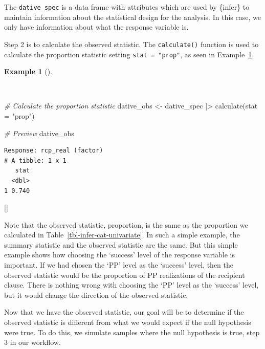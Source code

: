 \documentclass[
  letterpaper,
  krantz1]{latex/krantz-mod}
\newenvironment{Shaded}{\begin{snugshade}}{\end{snugshade}}
\newcommand{\AttributeTok}[1]{\textcolor[rgb]{0.00,0.00,0.00}{#1}}
\newcommand{\CommentTok}[1]{\textcolor[rgb]{0.00,0.00,0.00}{\textit{#1}}}
\newcommand{\FunctionTok}[1]{\textcolor[rgb]{0.00,0.00,0.00}{#1}}
\newcommand{\NormalTok}[1]{\textcolor[rgb]{0.00,0.00,0.00}{#1}}
\newcommand{\OtherTok}[1]{\textcolor[rgb]{0.00,0.00,0.00}{#1}}
\newcommand{\SpecialCharTok}[1]{\textcolor[rgb]{0.00,0.00,0.00}{#1}}
\newcommand{\StringTok}[1]{\textcolor[rgb]{0.00,0.00,0.00}{#1}}
\newcommand{\cindex}[1]{%
  \StrSubstitute{#1}{_}{\_}[\temp]%
  \index{\temp}%
}
\theoremstyle{definition}
\theoremstyle{definition}
\newtheorem{example}{Example}[chapter]
\theoremstyle{remark}
\begin{document}
The \texttt{dative\_spec} is a data frame with attributes which are used
by \{infer\} to maintain information about the statistical design for
the analysis. In this case, we only have information about what the
response variable is.

Step 2 is to calculate the observed statistic. The \texttt{calculate()}
function is used to calculate the proportion statistic setting
\texttt{stat\ =\ "prop"}, as seen in
Example~\ref{exm-infer-cat-calculate}.

\pagebreak

\begin{example}[]\protect\hypertarget{exm-infer-cat-calculate}{}\label{exm-infer-cat-calculate}

~

\begin{Shaded}
\begin{Highlighting}[numbers=left,,]
\CommentTok{\# Calculate the proportion statistic}
\NormalTok{dative\_obs }\OtherTok{\textless{}{-}}
\NormalTok{  dative\_spec }\SpecialCharTok{|\textgreater{}}
  \FunctionTok{calculate}\NormalTok{(}\AttributeTok{stat =} \StringTok{"prop"}\NormalTok{)}

\CommentTok{\# Preview}
\NormalTok{dative\_obs}
\end{Highlighting}
\end{Shaded}

\begin{verbatim}
Response: rcp_real (factor)
# A tibble: 1 x 1
   stat
  <dbl>
1 0.740
\end{verbatim}

 \cindex{calculate()}

\end{example}

Note that the observed statistic, proportion, is the same as the
proportion we calculated in Table~\ref{tbl-infer-cat-univariate}. In
such a simple example, the summary statistic and
the observed statistic are the same. But this simple example shows how
choosing the `success' level of the response variable is important. If
we had chosen the `PP' level as the `success' level, then the observed
statistic would be the proportion of PP realizations of the recipient
clause. There is nothing wrong with choosing the `PP' level as the
`success' level, but it would change the direction of the observed
statistic.

Now that we have the observed statistic, our goal will be to determine
if the observed statistic is different from what we would expect if the
null hypothesis were true. To do this, we simulate samples where the
null hypothesis is true, step 3 in
our workflow.
\end{document}
